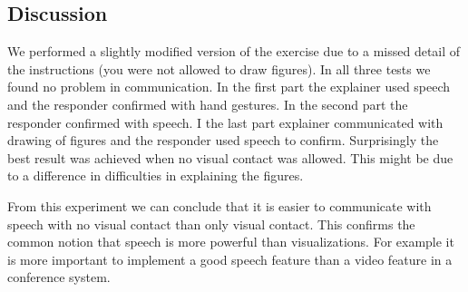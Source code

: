 \documentclass[10pt, a4paper]{article}
\begin{document}
\subsection{Discussion}
We performed a slightly modified version of the exercise due to a missed detail of the instructions (you were not allowed to draw figures). In all three tests we found no problem in communication. In the first part the explainer used speech and the responder confirmed with hand gestures. In the second part the responder confirmed with speech. I the last part explainer communicated with drawing of figures and the responder used speech to confirm. Surprisingly the best result was achieved when no visual contact was allowed. This might be due to a difference in difficulties in explaining the figures.

From this experiment we can conclude that it is easier to communicate with speech with no visual contact than only visual contact. This confirms the common notion that speech is more powerful than visualizations. For example it is more important to implement a good speech feature than a video feature in a conference system.

%
%
\end{document}
